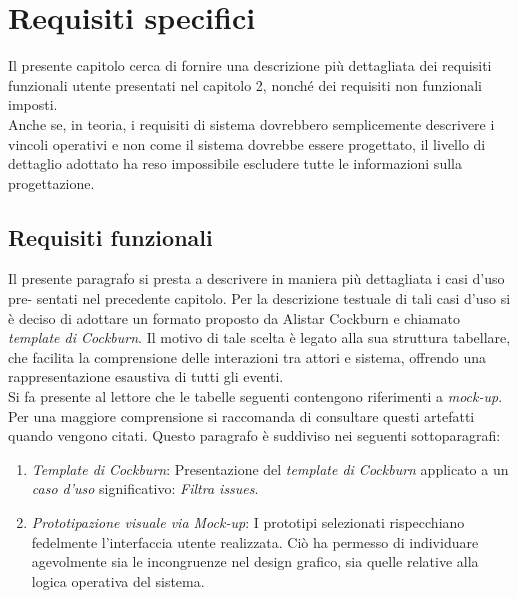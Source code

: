 \chapter{Requisiti specifici} %

\label{Chapter3} %



Il presente capitolo cerca di fornire una descrizione più dettagliata dei requisiti funzionali 
utente presentati nel capitolo 2, nonché dei requisiti non funzionali imposti. \\
\indent Anche se, in teoria, i requisiti di sistema dovrebbero semplicemente descrivere i vincoli operativi 
e non come il sistema dovrebbe essere progettato, il livello 
di dettaglio adottato ha reso impossibile escludere tutte le informazioni 
sulla progettazione.

\section{Requisiti funzionali}

Il presente paragrafo si presta a descrivere in maniera più dettagliata i casi d’uso pre-
sentati nel precedente capitolo. Per la descrizione testuale di tali casi d’uso si è deciso di adottare un formato proposto da Alistar Cockburn e chiamato \textit{template di Cockburn}. Il motivo di tale scelta è legato alla sua struttura tabellare, che facilita la comprensione
delle interazioni tra attori e sistema, offrendo una rappresentazione esaustiva di tutti
gli eventi. \\
\indent Si fa presente al lettore che le tabelle seguenti contengono riferimenti a \textit{mock-up}. Per una maggiore comprensione si raccomanda di consultare questi artefatti quando vengono citati. Questo paragrafo è suddiviso nei seguenti sottoparagrafi: \\

\begin{enumerate}
    \item \textit{Template di Cockburn}: Presentazione del \textit{template di Cockburn} applicato a un \textit{caso d'uso} significativo: \textit{Filtra issues}.
    \item \textit{Prototipazione visuale via Mock-up}: I prototipi selezionati rispecchiano fedelmente l'interfaccia utente realizzata. Ciò ha permesso di individuare agevolmente sia le incongruenze nel design grafico, sia quelle relative alla logica operativa del sistema.
\end{enumerate}


